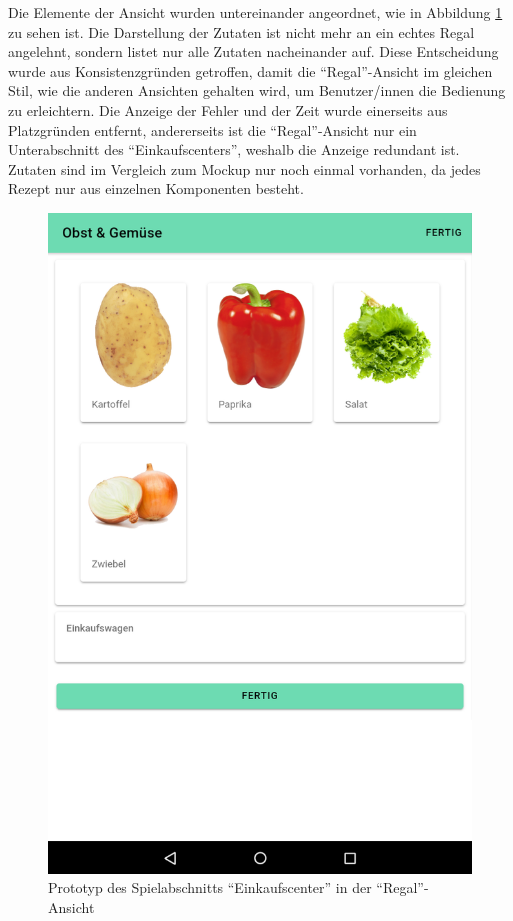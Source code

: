 Die Elemente der Ansicht wurden untereinander angeordnet, wie in Abbildung \ref{fig:game-shopping-shelf} zu sehen ist. Die Darstellung der Zutaten ist nicht mehr an ein echtes Regal angelehnt, sondern listet nur alle Zutaten nacheinander auf. Diese Entscheidung wurde aus Konsistenzgründen getroffen, damit die \enquote{Regal}-Ansicht im gleichen Stil, wie die anderen Ansichten gehalten wird, um Benutzer/innen die Bedienung zu erleichtern. Die Anzeige der Fehler und der Zeit wurde einerseits aus Platzgründen entfernt, andererseits ist die \enquote{Regal}-Ansicht nur ein Unterabschnitt des \enquote{Einkaufscenters}, weshalb die Anzeige redundant ist. Zutaten sind im Vergleich zum Mockup nur noch einmal vorhanden, da jedes Rezept nur aus einzelnen Komponenten besteht.

\begin{figure}[H]
    \centering
	\includegraphics[width=0.5\linewidth]{figures/development/application/shopping-shelf.png}
	\caption{Prototyp des Spielabschnitts \enquote{Einkaufscenter} in der \enquote{Regal}-Ansicht}
	\label{fig:game-shopping-shelf}
\end{figure}

